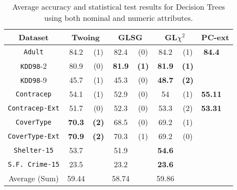 \begin{table}
\small
\caption{Average accuracy and statistical test results for  Decision Trees using both nominal and numeric attributes.}
\centering
\begin{tabular}{c|cc|cc|cc|cc} 
Dataset            &\multicolumn{2}{c|}{Twoing} & \multicolumn{2}{c|}{GLSG} & \multicolumn{2}{c|}{GL$\chi^2$} & \multicolumn{2}{c}{PC-ext}\\  \hline   
{\tt Adult}        & 84.2           & (1)       & 82.4       & (0)          &  84.2       & (1)               &  {\bf 84.4} &             \\
{\tt KDD98}-2      & 80.9           & (0)       & {\bf 81.9 }& {\bf (1)}    & {\bf 81.9}  & {\bf (1)}         &             &             \\ 
{\tt KDD98}-9      & 45.7           &   (1)     & 45.3       &  (0)         & {\bf 48.7 } &{\bf  (2)  }       &             &             \\ 
{\tt Contracep}    & 54.1           &  (1)      & 52.9       &  (0)         & 54          & (1)               & {\bf 55.11} &             \\ 
{\tt Contracep-Ext}& 51.7           &  (0)      & 52.3       &  (0)         & 53.3        & (2)               & {\bf 53.31} &             \\ 
{\tt CoverType}    &  {\bf 70.3 }   &  {\bf (2)}& 68.5       &  (0)         & 69.2        & (1)               &             &             \\ 
{\tt CoverType-Ext}& {\bf 70.9}     & {\bf (2) }& 70.3       &  (1)         & 69.2        & (0)               &             &             \\ 
{\tt Shelter-15}   &  53.7          &           & 51.9       &              & {\bf 54.6 } &                   &             &             \\   
{\tt S.F. Crime-15}& 23.5           &           & 23.2       &              & {\bf 23.6 } &                   &             &             \\ 
\hline
Average (Sum)      & 59.44          &           & 58.74      &              & 59.86       &                   &             &

\end{tabular}
\label{exp:secondsetnumeric}
\normalsize
\end{table}


